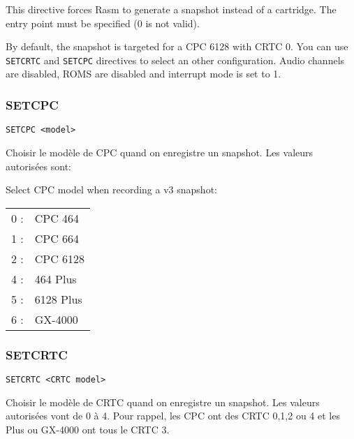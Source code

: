 \begin{xen}
  This directive forces Rasm to generate a snapshot instead of a cartridge.
  The entry point must be specified (0 is not valid).

  By default, the snapshot is targeted for a CPC 6128 with CRTC 0. You can use \texttt{SETCRTC} and \texttt{SETCPC} directives to select an other configuration.
  Audio channels are disabled, ROMS are disabled and interrupt mode is set to 1.
\end{xen}


\subsubsection{SETCPC}

\begin{verbatim}
SETCPC <model>
\end{verbatim}

\begin{xfr}
Choisir le modèle de CPC quand on enregistre un snapshot. Les valeurs autorisées sont:
\end{xfr}

\begin{xen}
Select CPC model when recording a v3 snapshot:
\end{xen}

\begin{tabular}{ll}
0 :& CPC 464 \\
1 :& CPC 664 \\
2 :& CPC 6128 \\
4 :& 464 Plus \\
5 :& 6128 Plus \\
6 :& GX-4000 \\
\end{tabular}

\subsubsection{SETCRTC}

\begin{verbatim}
SETCRTC <CRTC model>
\end{verbatim}

\begin{xfr}
Choisir le modèle de CRTC quand on enregistre un snapshot. Les valeurs autorisées vont de 0 à 4. Pour rappel, les CPC ont des CRTC 0,1,2 ou 4 et les Plus ou GX-4000 ont tous le CRTC 3.
\end{xfr}

